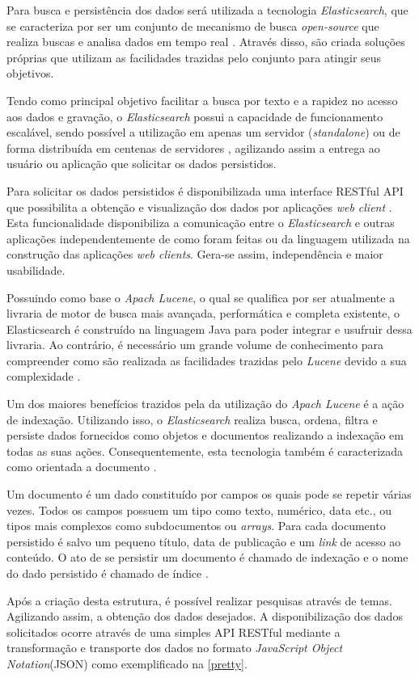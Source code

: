 Para busca e persistência dos dados será utilizada a tecnologia \textit{Elasticsearch}, que se caracteriza por ser um conjunto de mecanismo de busca \textit{open-source} que realiza buscas e analisa dados em tempo real \cite{Gil:2010}. Através disso, são criada soluções próprias que utilizam as  facilidades trazidas pelo conjunto para atingir seus objetivos.

Tendo como principal objetivo facilitar a busca por texto e a rapidez no acesso aos dados e gravação, o \textit{Elasticsearch} possui a capacidade de funcionamento escalável, sendo possível a utilização em apenas um servidor (\textit{standalone}) ou de forma distribuída em centenas de servidores \cite{Gormley:2015}, agilizando assim a entrega ao usuário ou aplicação que solicitar os dados persistidos.

Para solicitar os dados persistidos é disponibilizada uma interface RESTful API que possibilita a obtenção e visualização dos dados por aplicações \textit{web client} \cite{Gormley:2015}. Esta funcionalidade disponibiliza a comunicação entre o \textit{Elasticsearch} e outras aplicações independentemente de como foram feitas ou da linguagem utilizada na construção das aplicações \textit{web clients}. Gera-se assim, independência e maior usabilidade.

Possuindo como base o \textit{Apach Lucene}, o qual se qualifica por ser atualmente a livraria de motor de busca mais avançada, performática e completa  existente, o Elasticsearch é construído na linguagem Java para poder integrar e usufruir dessa livraria. Ao contrário, é necessário um grande volume de conhecimento para compreender como são realizada as facilidades trazidas pelo \textit{Lucene} devido a sua complexidade \cite{Gormley:2015}.

Um dos maiores benefícios trazidos pela da utilização do \textit{Apach Lucene} é a ação de indexação. Utilizando isso, o \textit{Elasticsearch} realiza busca, ordena, filtra e persiste dados fornecidos como objetos e documentos realizando a indexação em todas as suas ações. Consequentemente, esta tecnologia também é caracterizada como orientada a documento \cite{Gormley:2015}.

Um documento é um dado constituído por campos os quais pode se repetir várias vezes. Todos os campos possuem um tipo como texto, numérico, data etc., ou tipos mais complexos como subdocumentos ou \textit{arrays}. Para cada documento persistido é salvo um pequeno título, data de publicação e um \textit{link} de acesso ao conteúdo. O ato de se persistir um documento é chamado de indexação e o nome do dado persistido é chamado de índice \cite{Kuc:2013}.

Após a criação desta estrutura, é possível realizar pesquisas através de temas. Agilizando assim, a obtenção dos dados desejados. A disponibilização dos dados solicitados ocorre através de uma simples API RESTful mediante a transformação e transporte dos dados no formato \textit{JavaScript Object Notation}(JSON) como exemplificado na \autoref{pretty}.
